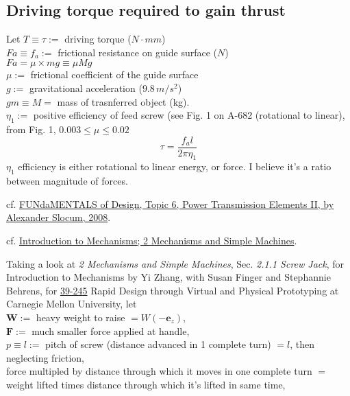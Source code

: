 \documentclass[10pt]{amsart}
\begin{document}
\begin{multicols*}{2}
\subsection{Driving torque required to gain thrust} 

Let 
$T \equiv \tau := $ driving torque ($N \cdot mm$) \\
$Fa \equiv f_a := $ frictional resistance on guide surface ($N$) \\
$Fa= \mu \times mg \equiv \mu Mg$ \\
$\mu := $ frictional coefficient of the guide surface  \\
$g := $ gravitational acceleration ($9.8 \, m/s^2$)  \\
$gm \equiv M =$ mass of trasnferred object (kg).  \\
$\eta_1 :=$ positive efficiency of feed screw (see Fig. 1 on A-682 (rotational to linear), from Fig. 1, $0.003 \leq \mu \leq 0.02$ 
\begin{equation}
\tau =  \frac{ f_a l }{ 2\pi \eta_1 }
\end{equation}
$\eta_1$ efficiency is either rotational to linear energy, or force.  I believe it's a ratio between magnitude of forces.  


cf. \href{http://web.mit.edu/2.75/fundamentals/FUNdaMENTALs\%20Book\%20pdf/FUNdaMENTALs\%20Topic\%206.PDF}{FUNdaMENTALS of Design, Topic 6, Power Transmission Elements II, by Alexander Slocum, 2008}.  


cf. \href{https://www.cs.cmu.edu/~rapidproto/mechanisms/chpt2.html}{Introduction to Mechanisms; 2 Mechanisms and Simple Machines}.  

Taking a look at \emph{2 Mechanisms and Simple Machines}, Sec. \emph{2.1.1 Screw Jack}, for Introduction to Mechanisms by Yi Zhang, with Susan Finger and Stephannie Behrens, for \href{https://www.cs.cmu.edu/~rapidproto/home.html}{39-245} Rapid Design through Virtual and Physical Prototyping at Carnegie Mellon University, let \\
$\mathbf{W} :=$ heavy weight to raise $= W(-\mathbf{e}_z)$, \\
$\mathbf{F}:=$ much smaller force applied at handle, \\
$p \equiv l :=$ pitch of screw (distance advanced in 1 complete turn) $=l$, then \\
neglecting friction, \\
force multipled by distance through which it moves in one complete turn $=$ weight lifted times distance through which it's lifted in same time, 


\end{multicols*}
\end{document}
